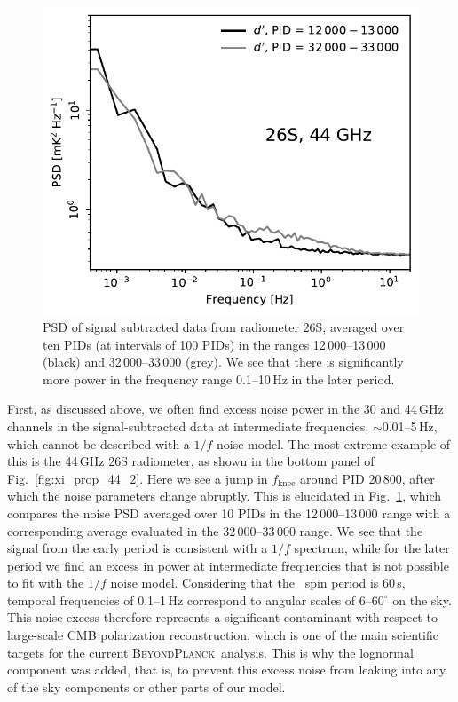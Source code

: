 \documentclass{aa}
\newcommand{\BP}{\textsc{BeyondPlanck}}
\begin{document}
\begin{figure}
        \begin{center}
                \includegraphics[width=\linewidth]{figs/ps_running_mean_26S.pdf}
        \end{center}
        \caption{PSD of signal subtracted data from radiometer 26S, averaged over ten PIDs (at intervals of 100 PIDs) in the ranges 
    12\,000--13\,000 (black) and 32\,000--33\,000 (grey). We see that there is
    significantly more power in the frequency range 0.1--10\,Hz in the later period. 
                \label{fig:ps_compare_26S}}
\end{figure}

First, as discussed above, we often find excess noise power in the 30
and 44\,GHz channels in the signal-subtracted data at intermediate
frequencies, $\sim$0.01--5\,Hz, which cannot be described with a
$1/f$ noise model. The most extreme
example of this is the 44\,GHz 26S radiometer, as shown in the bottom
panel of Fig.~\ref{fig:xi_prop_44_2}. Here we see a jump in $f_\mathrm{knee}$ around PID 20\,800,
after which the noise parameters change abruptly. This is elucidated in Fig.~\ref{fig:ps_compare_26S},
which compares the noise PSD averaged over 10 PIDs in the
12\,000--13\,000 range with a corresponding average evaluated in the
32\,000--33\,000 range. We see that the signal from the early period is consistent with a $1/f$ spectrum, while for the later period we find an excess in power at intermediate
frequencies that is not possible to fit with the $1/f$ noise
model. Considering that the \Planck\ spin period is 60\,s, temporal
frequencies of 0.1--1\,Hz correspond to angular scales of
6--$60^{\circ}$ on the sky. This noise excess therefore represents
a significant contaminant with respect to large-scale CMB polarization
reconstruction, which is one of the main scientific targets for the
current \BP\ analysis. This is why the lognormal component was added, that is, to prevent this excess noise from leaking into any of the sky components or other parts of our model.
\end{document}

